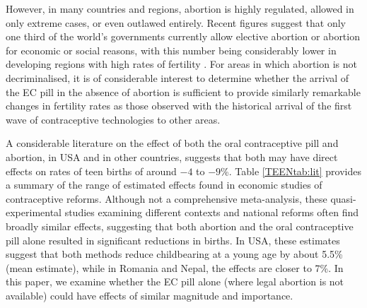 However, in many countries and regions, abortion is highly regulated, allowed
in only extreme cases, or even outlawed entirely.  Recent figures suggest that 
only one third of the world's governments currently allow elective abortion or 
abortion for economic or social reasons, with this number being considerably 
lower in developing regions with high rates of fertility \citep{UN2014}.  For 
areas in which abortion is not decriminalised, it is of considerable interest 
to determine whether the arrival of the EC pill in the absence of abortion 
is sufficient to provide similarly remarkable changes in fertility rates as 
those observed with the historical arrival of the first wave of contraceptive 
technologies to other areas.


A considerable literature on the effect of both the oral contraceptive pill
and abortion, in USA and in other countries, suggests that both may have direct
effects on rates of teen births of around $-4$ to $-9$\%.
Table \ref{TEENtab:lit} provides a summary of the range of estimated effects
found in economic studies of contraceptive reforms.  Although not a comprehensive
meta-analysis, these quasi-experimental studies examining different contexts and
national reforms often find broadly similar effects, suggesting that both
abortion and the oral contraceptive pill alone resulted in significant 
reductions in births. In USA, these estimates suggest that both methods reduce 
childbearing at a young age by about 5.5\% (mean estimate), while in Romania 
and Nepal, the effects are closer to 7\%.  In this paper, we examine whether the 
EC pill alone (where legal abortion is not available) could have effects of
similar magnitude and importance.

